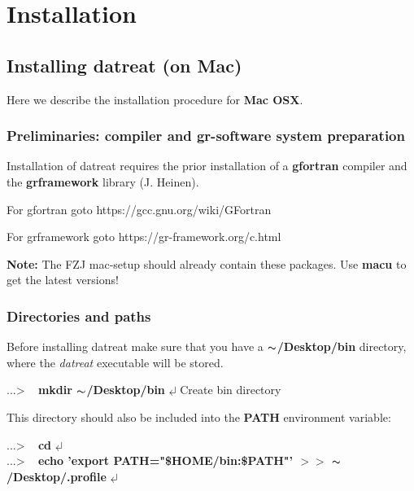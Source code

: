 \documentclass[11pt,fleqn]{book} %
\newcommand{\linespace}{\vspace{4ex}}
\newcommand{\return}{$\carriagereturn$} %
\newcommand{\sysprompt}{{\color{green}...\textgreater} ~ }
\newcommand{\home}{${\thicksim}$/Desktop}
\newcommand{\enter}[1]{{\color{red} \bf #1}}
\newcommand{\desc}[1]{\hskip 0.5cm {\color{descgray} #1}}
\newcommand{\expl}[1]{\hskip 0.5cm {\color{explgray} #1}}
\begin{document}
\part{Installation}

\chapter{Installing datreat (on Mac)}

Here we describe the installation procedure for {\bf Mac OSX}.

\section{Preliminaries: compiler and gr-software \desc{system preparation}}

Installation of datreat requires the prior installation of a {\bf gfortran} compiler and
the {\bf grframework} library (J. Heinen).

For gfortran goto https://gcc.gnu.org/wiki/GFortran 

For grframework goto https://gr-framework.org/c.html

\linespace
{\bf Note:} The FZJ mac-setup should already contain these packages. Use {\bf macu} to
get the latest versions!

\section{Directories and paths}
%
Before installing datreat make sure that you have a {\bf \home/bin} directory, where the
\emph{datreat} executable will be stored.

\begin{corollary}
\sysprompt {\bf mkdir \home/bin} \return  \expl{Create bin directory}
\end{corollary}

This directory should also be included into the {\bf PATH} environment variable:
\begin{corollary}
\sysprompt {\bf cd} \return \\
\sysprompt {\bf echo 'export PATH="\$HOME/bin:\$PATH"' $>>$ \home/.profile} \return 
\end{corollary}
\end{document}
